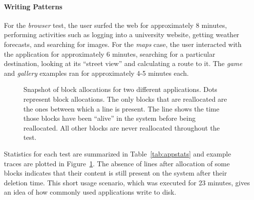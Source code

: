 \documentclass{acmtog}
\begin{document}
\paragraph{Writing Patterns}
For the \emph{browser} test, the user surfed the web for approximately
8 minutes, performing activities such as logging
into a university website, getting weather forecasts, and searching
for images. For the \emph{maps} case, the user interacted with the
application for approximately 6 minutes, searching for a particular
destination, looking at its ``street view'' and calculating a route to
it. The \emph{game} and \emph{gallery} examples ran for
approximately 4-5 minutes each.

\begin{figure}[tb!]
  \centering
  \qquad
  \caption{\small Snapshot of block allocations for two different
    applications. Dots represent block allocations. The only blocks
    that are reallocated are the ones between which a line is present. The
    line shows the time those blocks have been ``alive'' in
    the system before being reallocated. All other blocks are never
    reallocated throughout the test.
    \label{fig:browsermaps}\normalsize}
\end{figure}


\begin{table}[t]
\centering
{}
\caption{\small Average reallocation period for different commonly
  used applications. The test ran for 23 minutes and allocated 304 blocks.
  \label{tab:appstats}\normalsize}
\end{table}

Statistics for each test are summarized in Table~\ref{tab:appstats}
and example traces are plotted in Figure~\ref{fig:browsermaps}. The absence of
lines after allocation of some blocks indicates that their content is still
present on the system after their deletion time.
This short usage scenario, which was executed for 23 minutes, gives an
idea of how commonly used applications write to disk.
\end{document}
